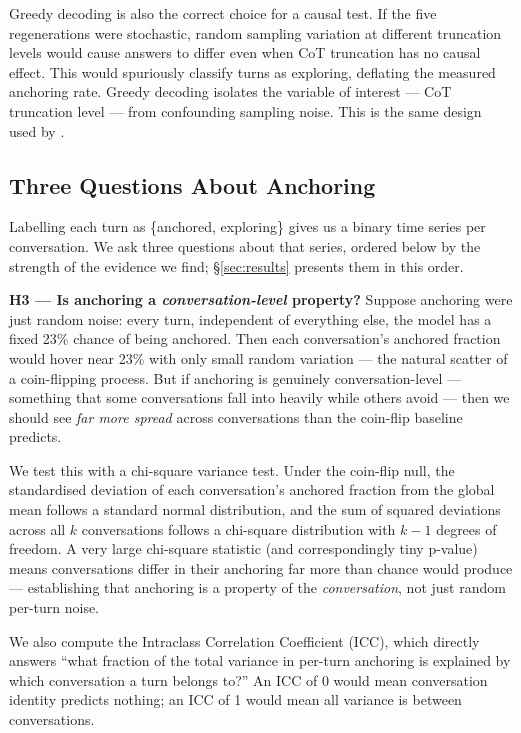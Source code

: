 \documentclass{article}
\begin{document}
Greedy decoding is also the correct choice for a causal test.
If the five regenerations were stochastic, random sampling
variation at different truncation levels would cause answers
to differ even when CoT truncation has no causal effect.
This would spuriously classify turns as exploring, deflating
the measured anchoring rate.
Greedy decoding isolates the variable of interest --- CoT
truncation level --- from confounding sampling noise.
This is the same design used by \citet{lanham2023}.

\subsection{Three Questions About Anchoring}

Labelling each turn as \{anchored, exploring\} gives us a binary
time series per conversation.
We ask three questions about that series, ordered below by the
strength of the evidence we find; \S\ref{sec:results} presents
them in this order.

\bigskip
\noindent\textbf{H3 --- Is anchoring a \emph{conversation-level} property?}
Suppose anchoring were just random noise: every turn, independent
of everything else, the model has a fixed 23\% chance of being
anchored.
Then each conversation's anchored fraction would hover near 23\%
with only small random variation --- the natural scatter of a
coin-flipping process.
But if anchoring is genuinely conversation-level --- something
that some conversations fall into heavily while others avoid ---
then we should see \emph{far more spread} across conversations
than the coin-flip baseline predicts.

We test this with a chi-square variance test.
Under the coin-flip null, the standardised deviation of each
conversation's anchored fraction from the global mean follows a
standard normal distribution, and the sum of squared deviations
across all $k$ conversations follows a chi-square distribution
with $k{-}1$ degrees of freedom.
A very large chi-square statistic (and correspondingly tiny
p-value) means conversations differ in their anchoring far more
than chance would produce --- establishing that anchoring is a
property of the \emph{conversation}, not just random per-turn
noise.

We also compute the Intraclass Correlation Coefficient (ICC),
which directly answers ``what fraction of the total variance in
per-turn anchoring is explained by which conversation a turn
belongs to?''
An ICC of 0 would mean conversation identity predicts nothing;
an ICC of 1 would mean all variance is between conversations.
\end{document}
